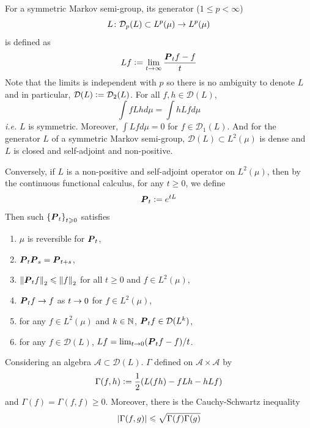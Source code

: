 \documentclass[a4paper,12pt]{article}
\begin{document}
\begin{itemize}
  \noindent For a symmetric Markov semi-group, its generator ($1 \leqslant p <\infty$)
  \begin{equation*}
    L \colon \mathcal{D}_p(L) \subset L^p(\mu) \rightarrow L^p(\mu)
  \end{equation*}
  is defined as
  \begin{equation*}
    Lf \vcentcolon= \lim_{t \rightarrow \infty} \frac{\boldsymbol{P}_tf - f}{t}
  \end{equation*}
  Note that the limits is independent with $p$ so there is no ambiguity to denote $L$ and in particular, $\mathcal{D}(L)\vcentcolon= \mathcal{D}_2(L)$. For all $f,h \in \mathcal{D}(L)$, 
  \begin{equation*}
    \int fLh d\mu = \int hLf d \mu
  \end{equation*}
  \emph{i.e.} $L$ is symmetric. Moreover, $\int Lf d\mu = 0$ for $f \in \mathcal{D}_1(L)$. And for the generator $L$ of a symmetric Markov semi-group, $\mathcal{D}(L) \subset L^2(\mu)$ is dense and $L$ is closed and self-adjoint and non-positive. 

  \noindent Conversely, if $L$ is a non-positive and self-adjoint operator on $L^2(\mu)$, then by the continuous functional calculus, for any $t \geqslant 0$, we define
  \begin{equation*}
    \boldsymbol{P}_t \vcentcolon= e^{tL}
  \end{equation*}
  Then such $\left\{\boldsymbol{P}_t\right\}_{t \geqslant 0}$ satisfies
  \begin{enumerate}[label=(\roman*)]
    \item $\mu$ is reversible for $\boldsymbol{P}_t$,
    \item $\boldsymbol{P}_t\boldsymbol{P}_s=\boldsymbol{P}_{t+s}$,
    \item $\left\lVert\boldsymbol{P}_tf\right\lVert_2 \leqslant \left\lVert f\right\lVert_2$ for all $t \geqslant 0$ and $f \in L^2(\mu)$,
    \item $\boldsymbol{P}_tf \rightarrow f$ as $t \rightarrow 0$ for $f \in L^2(\mu)$,
    \item for any $f \in L^2(\mu)$ and $k \in \mathbb{N}$, $\boldsymbol{P}_tf \in \mathcal{D}(L^k)$,
    \item for any $f \in \mathcal{D}(L)$, $Lf = \lim_{t\rightarrow 0} (\boldsymbol{P}_tf - f) /t$.
  \end{enumerate}

  \noindent Considering an algebra $\mathcal{A} \subset \mathcal{D}(L)$. $\Gamma$ defined on $\mathcal{A} \times \mathcal{A}$ by
  \begin{equation*}
    \Gamma(f,h) \vcentcolon= \frac{1}{2}(L(fh) - fLh - hLf)
  \end{equation*}
  and $\Gamma(f) = \Gamma(f,f) \geqslant 0$. Moreover, there is the Cauchy-Schwartz inequality
  \begin{equation*}
    \left\lvert\Gamma(f,g)\right\lvert \leqslant \sqrt{\Gamma(f)\Gamma(g)}
  \end{equation*}


\end{itemize}
\end{document}
